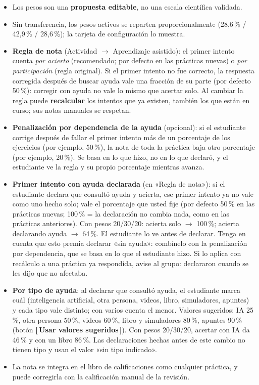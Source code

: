 \documentclass[11pt,a4paper,oneside]{book}
\newcommand{\boton}[1]{\textsf{\textbf{[\,#1\,]}}}
\begin{document}
\begin{itemize}
  \item Los pesos son una \textbf{propuesta editable}, no una escala científica validada.
  \item Sin transferencia, los pesos activos se reparten proporcionalmente (28,6\,\% / 42,9\,\% / 28,6\,\%); la tarjeta
        de configuración lo muestra.
  \item \textbf{Regla de nota} (Actividad $\rightarrow$ Aprendizaje asistido): el primer intento cuenta \emph{por acierto}
        (recomendado; por defecto en las prácticas nuevas) o \emph{por participación} (regla original). Si el primer
        intento no fue correcto, la respuesta corregida después de buscar ayuda vale una fracción de su parte (por
        defecto 50\,\%): corregir con ayuda no vale lo mismo que acertar solo. Al cambiar la regla puede
        \textbf{recalcular} los intentos que ya existen, también los que están en curso; sus notas manuales se respetan.
  \item \textbf{Penalización por dependencia de la ayuda} (opcional): si el estudiante corrige después de fallar el
        primer intento más de un porcentaje de los ejercicios (por ejemplo, 50\,\%), la nota de toda la práctica baja
        otro porcentaje (por ejemplo, 20\,\%). Se basa en lo que hizo, no en lo que declaró, y el estudiante ve la regla y
        su propio porcentaje mientras avanza.
  \item \textbf{Primer intento con ayuda declarada} (en «Regla de nota»): si el estudiante declara que consultó
        ayuda y acierta, ese primer intento ya no vale como uno hecho solo; vale el porcentaje que usted fije (por
        defecto 50\,\% en las prácticas nuevas; 100\,\% = la declaración no cambia nada, como en las prácticas
        anteriores). Con pesos 20/30/20: acierta solo $\rightarrow$ 100\,\%; acierta declarando ayuda
        $\rightarrow$ 64\,\%. El estudiante lo ve antes de declarar. Tenga en cuenta que esto premia declarar
        «sin ayuda»: combínelo con la penalización por dependencia, que se basa en lo que el estudiante hizo. Si lo
        aplica con recálculo a una práctica ya respondida, avise al grupo: declararon cuando se les dijo que no
        afectaba.
  \item \textbf{Por tipo de ayuda}: al declarar que consultó ayuda, el estudiante marca cuál (inteligencia
        artificial, otra persona, videos, libro, simuladores, apuntes) y cada tipo vale distinto; con varios cuenta el
        menor. Valores sugeridos: IA 25\,\%, otra persona 50\,\%, videos 60\,\%, libro y simuladores 80\,\%, apuntes
        90\,\% (botón \boton{Usar valores sugeridos}). Con pesos 20/30/20, acertar con IA da 46\,\% y con un libro
        86\,\%. Las declaraciones hechas antes de este cambio no tienen tipo y usan el valor «sin tipo indicado».
  \item La nota se integra en el libro de calificaciones como cualquier práctica, y puede corregirla con la
        calificación manual de la revisión.
\end{itemize}
\end{document}
